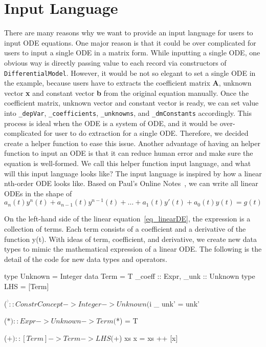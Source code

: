 \section{Input Language}
\label{sec_input}
There are many reasons why we want to provide an input language for users to input ODE equations. One major reason is that it could be over complicated for users to input a single ODE in a matrix form. While inputting a single ODE, one obvious way is directly passing value to each record via constructors of \verb|DifferentialModel|. However, it would be not so elegant to set a single ODE in the example, because users have to extracts the coefficient matrix \textbf{A}, unknown vector \textbf{x} and constant vector \textbf{b} from the original equation manually. Once the coefficient matrix, unknown vector and constant vector is ready, we can set value into \verb|_depVar|, \verb|_coefficients|, \verb|_unknowns|, and \verb|_dmConstants| accordingly. This process is ideal when the ODE is a system of ODE, and it would be over-complicated for user to do extraction for a single ODE. Therefore, we decided create a helper function to ease this issue. Another advantage of having an helper function to input an ODE is that it can reduce human error and make sure the equation is well-formed. We call this helper function input language, and what will this input language looks like? The input language is inspired by how a linear nth-order ODE looks like. Based on Paul's Online Notes~\citep{paullinearode}, we can write all linear ODEs in the shape of 
\begin{equation} \label{eq_linearDE}
	a_n(t)y^n(t) + a_{n-1}(t)y^{n-1}(t) + \dots + a_1(t)y'(t) + a_0(t)y(t) = g(t)
\end{equation}

On the left-hand side of the linear equation~\ref{eq_linearDE}, the expression is a collection of terms. Each term consists of a coefficient and a derivative of the function y(t). With ideas of term, coefficient, and derivative, we create new data types to mimic the mathematical expression of a linear ODE. The following is the detail of the code for new data types and operators.

\begin{haskell1}
type Unknown = Integer
data Term = T{
	_coeff :: Expr,
	_unk :: Unknown
}
type LHS = [Term]

($^^) :: ConstrConcept -> Integer -> Unknown
($^^) _ unk' = unk'

($*) :: Expr -> Unknown -> Term
($*) = T

($+) :: [Term] -> Term -> LHS
($+) xs x  = xs ++ [x]
\end{haskell1}

